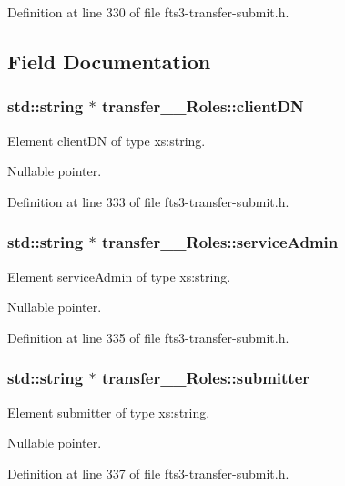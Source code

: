 Definition at line 330 of file fts3-\/transfer-\/submit.h.



\subsection{Field Documentation}
\subsubsection[{clientDN}]{\setlength{\rightskip}{0pt plus 5cm}std::string $\ast$ {\bf transfer\_\-\_\-Roles::clientDN}}\label{classtransfer____Roles_a09a76265a1f8083626730a13b608e26b}


Element clientDN of type xs:string. 

Nullable pointer. 

Definition at line 333 of file fts3-\/transfer-\/submit.h.

\subsubsection[{serviceAdmin}]{\setlength{\rightskip}{0pt plus 5cm}std::string $\ast$ {\bf transfer\_\-\_\-Roles::serviceAdmin}}\label{classtransfer____Roles_a324fe63eab38c3f016389a067630fb56}


Element serviceAdmin of type xs:string. 

Nullable pointer. 

Definition at line 335 of file fts3-\/transfer-\/submit.h.

\subsubsection[{submitter}]{\setlength{\rightskip}{0pt plus 5cm}std::string $\ast$ {\bf transfer\_\-\_\-Roles::submitter}}\label{classtransfer____Roles_a35339a6f4e827cb5e37800bbea4dd1fd}


Element submitter of type xs:string. 

Nullable pointer. 

Definition at line 337 of file fts3-\/transfer-\/submit.h.

